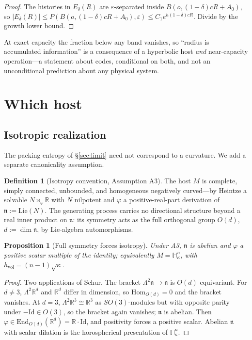 \documentclass[11pt,reqno]{amsart}
\theoremstyle{plain}
\newtheorem{proposition}[theorem]{Proposition}
\theoremstyle{definition}
\newtheorem{definition}[theorem]{Definition}
\newcommand{\hvol}{h_{\mathrm{vol}}}
\newcommand{\Hk}{\mathbb{H}^n_\kappa}
\newcommand{\eps}{\varepsilon}
\begin{document}
\begin{proof}
The histories in $E_\delta(R)$ are $\eps$-separated inside $B(o,(1-\delta)cR+A_0)$, so $|E_\delta(R)|\le P(B(o,(1-\delta)cR+A_0),\eps)\le C_1 e^{h(1-\delta)cR}$. Divide by the growth lower bound.
\end{proof}

At exact capacity the fraction below any band vanishes, so ``radius is accumulated information'' is a consequence of a hyperbolic host \emph{and} near-capacity operation---a statement about codes, conditional on both, and not an unconditional prediction about any physical system.

\section{Which host}\label{sec:chart}

\subsection{Isotropic realization}

The packing entropy of \S\ref{sec:limit} need not correspond to a curvature. We add a separate canonicality assumption.

\begin{definition}[Isotropy convention, Assumption A3]
The host $M$ is complete, simply connected, unbounded, and homogeneous negatively curved---by Heintze \cite{heintze1974} a solvable $N\rtimes_\varphi\mathbb R$ with $N$ nilpotent and $\varphi$ a positive-real-part derivation of $\mathfrak n:=\mathrm{Lie}(N)$. The generating process carries no directional structure beyond a real inner product on $\mathfrak n$: its symmetry acts as the full orthogonal group $O(d)$, $d:=\dim\mathfrak n$, by Lie-algebra automorphisms.
\end{definition}

\begin{proposition}[Full symmetry forces isotropy]\label{prop:schur}
Under A3, $\mathfrak n$ is abelian and $\varphi$ a positive scalar multiple of the identity; equivalently $M=\Hk$, with $\hvol=(n-1)\sqrt\kappa$.
\end{proposition}

\begin{proof}
Two applications of Schur. The bracket $\Lambda^2\mathfrak n\to\mathfrak n$ is $O(d)$-equivariant. For $d\ne3$, $\Lambda^2\mathbb R^d$ and $\mathbb R^d$ differ in dimension, so $\mathrm{Hom}_{O(d)}=0$ and the bracket vanishes. At $d=3$, $\Lambda^2\mathbb R^3\cong\mathbb R^3$ as $SO(3)$-modules but with opposite parity under $-\mathrm{Id}\in O(3)$, so the bracket again vanishes; $\mathfrak n$ is abelian. Then $\varphi\in\mathrm{End}_{O(d)}(\mathbb R^d)=\mathbb R\cdot\mathrm{Id}$, and positivity forces a positive scalar. Abelian $\mathfrak n$ with scalar dilation is the horospherical presentation of $\Hk$.
\end{proof}
\end{document}
